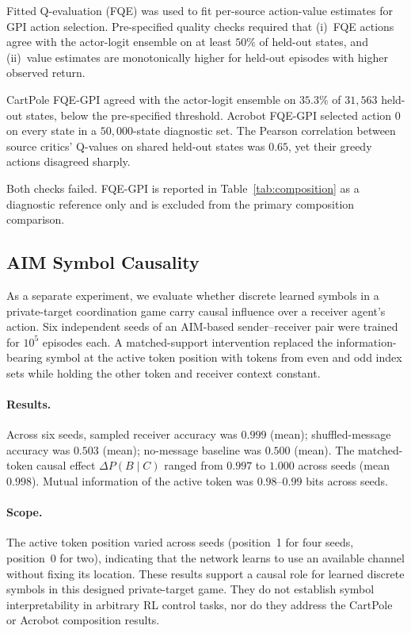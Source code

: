 \documentclass[12pt]{article}
\begin{document}
Fitted Q-evaluation (FQE) was used to fit per-source action-value
estimates for GPI action selection.
Pre-specified quality checks required that (i)~FQE actions agree with
the actor-logit ensemble on at least $50\%$ of held-out states, and
(ii)~value estimates are monotonically higher for held-out episodes
with higher observed return.

CartPole FQE-GPI agreed with the actor-logit ensemble on $35.3\%$ of
$31{,}563$ held-out states, below the pre-specified threshold.
Acrobot FQE-GPI selected action 0 on every state in a $50{,}000$-state
diagnostic set.
The Pearson correlation between source critics' Q-values on shared
held-out states was $0.65$, yet their greedy actions disagreed sharply.

Both checks failed.
FQE-GPI is reported in Table~\ref{tab:composition} as a diagnostic
reference only and is excluded from the primary composition comparison.

\subsection{AIM Symbol Causality}
\label{sec:results:aim}

As a separate experiment, we evaluate whether discrete learned symbols
in a private-target coordination game carry causal influence over
a receiver agent's action.
Six independent seeds of an AIM-based sender--receiver pair were trained
for $10^5$ episodes each.
A matched-support intervention replaced the information-bearing symbol
at the active token position with tokens from even and odd index sets
while holding the other token and receiver context constant.

\paragraph{Results.}
Across six seeds, sampled receiver accuracy was $0.999$ (mean);
shuffled-message accuracy was $0.503$ (mean);
no-message baseline was $0.500$ (mean).
The matched-token causal effect $\Delta P(B \mid C)$ ranged from
$0.997$ to $1.000$ across seeds (mean $0.998$).
Mutual information of the active token was $0.98$--$0.99$ bits across seeds.

\paragraph{Scope.}
The active token position varied across seeds (position~1 for four seeds,
position~0 for two), indicating that the network learns to use an available
channel without fixing its location.
These results support a causal role for learned discrete symbols in
this designed private-target game.
They do not establish symbol interpretability in arbitrary RL control
tasks, nor do they address the CartPole or Acrobot composition results.
\end{document}
